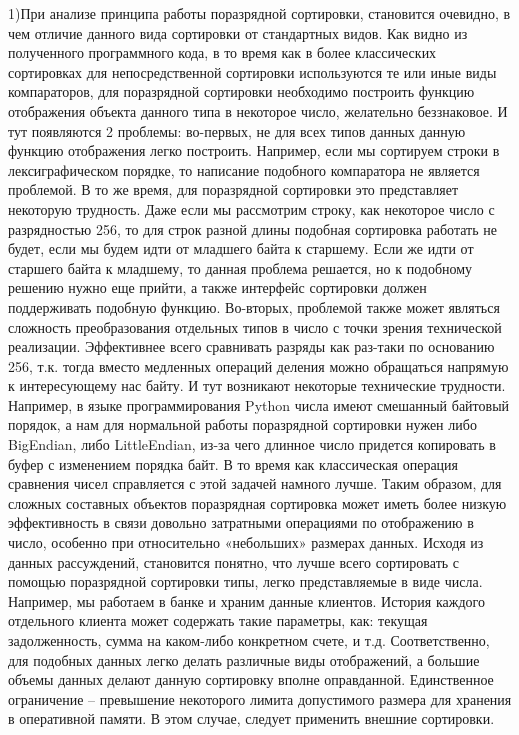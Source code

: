 \documentclass[a4paper, 14pt]{report}
\begin{document}
1)При анализе принципа работы поразрядной сортировки, становится очевидно, в чем отличие данного вида сортировки от стандартных видов. Как видно из полученного программного кода, в то время как в более классических сортировках для непосредственной сортировки используются те или иные виды компараторов, для поразрядной сортировки необходимо построить функцию отображения объекта данного типа в некоторое число, желательно беззнаковое. И тут появляются 2 проблемы: во-первых, не для всех типов данных данную функцию отображения легко построить. Например, если мы сортируем строки в лексиграфическом порядке, то написание подобного компаратора не является проблемой. В то же время, для поразрядной сортировки это представляет некоторую трудность. Даже если мы рассмотрим строку, как некоторое число с разрядностью 256, то для строк разной длины подобная сортировка работать не будет, если мы будем идти от младшего байта к старшему. Если же идти от старшего байта к младшему, то данная проблема решается, но к подобному решению нужно еще прийти, а также интерфейс сортировки должен поддерживать подобную функцию. Во-вторых, проблемой также может являться сложность преобразования отдельных типов в число с точки зрения технической реализации. Эффективнее всего сравнивать разряды как раз-таки по основанию 256, т.к. тогда вместо медленных операций деления можно обращаться напрямую к интересующему нас байту. И тут возникают некоторые технические трудности. Например, в языке программирования Python числа имеют смешанный байтовый порядок, а нам для нормальной работы поразрядной сортировки нужен либо BigEndian, либо LittleEndian, из-за чего длинное число придется копировать в буфер с изменением порядка байт. В то время как классическая операция сравнения чисел справляется с этой задачей намного лучше. Таким образом, для сложных составных объектов поразрядная сортировка может иметь более низкую эффективность в связи довольно затратными операциями по отображению в число, особенно при относительно «небольших» размерах данных.
Исходя из данных рассуждений, становится понятно, что лучше всего сортировать с помощью поразрядной сортировки типы, легко представляемые в виде числа. Например, мы работаем в банке и храним данные клиентов. История каждого отдельного клиента может содержать такие параметры, как: текущая задолженность, сумма на каком-либо конкретном счете, и т.д. Соответственно, для подобных данных легко делать различные виды отображений, а большие объемы данных делают данную сортировку вполне оправданной. Единственное ограничение – превышение некоторого лимита допустимого размера для хранения в оперативной памяти. В этом случае, следует применить внешние сортировки.
\end{document}
